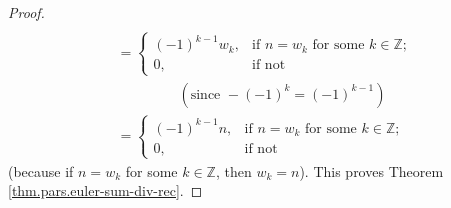 \begin{proof}
\begin{align*}
\\
&  =%
\begin{cases}
\left(  -1\right)  ^{k-1}w_{k}, & \text{if }n=w_{k}\text{ for some }%
k\in\mathbb{Z};\\
0, & \text{if not}%
\end{cases}
\\
&  \ \ \ \ \ \ \ \ \ \ \ \ \ \ \ \ \ \ \ \ \left(  \text{since }-\left(
-1\right)  ^{k}=\left(  -1\right)  ^{k-1}\right) \\
&  =%
\begin{cases}
\left(  -1\right)  ^{k-1}n, & \text{if }n=w_{k}\text{ for some }k\in
\mathbb{Z};\\
0, & \text{if not}%
\end{cases}
\end{align*}
(because if $n=w_{k}$ for some $k\in\mathbb{Z}$, then $w_{k}=n$). This proves
Theorem \ref{thm.pars.euler-sum-div-rec}.
\end{proof}
